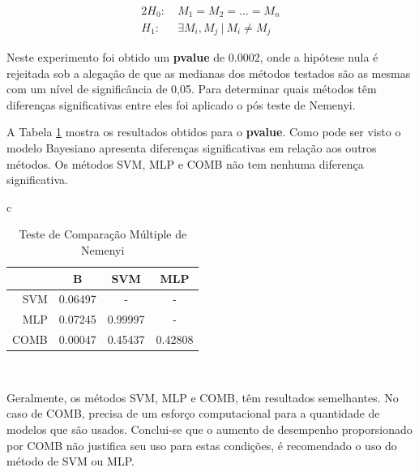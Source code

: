 \documentclass[12pt]{article}
\begin{document}
\begin{alignat*}{2}
  H_0:  & \ M_1 = M_2 = ... =M_n \\
  H_1:  & \ \exists M_i,M_j \ | \ M_i\neq M_j
\end{alignat*}

Neste experimento foi obtido um \textbf{pvalue} de 0.0002, onde a hipótese nula é rejeitada sob a alegação de que as medianas dos métodos testados são as mesmas com um nível de significância de 0,05. Para determinar quais métodos têm diferenças significativas entre eles foi aplicado o pós teste de Nemenyi.

A Tabela \ref{tab:test_nemeyi} mostra os resultados obtidos para o \textbf{pvalue}. Como pode ser visto o modelo Bayesiano apresenta diferenças significativas em relação aos outros métodos. Os métodos SVM, MLP e  COMB não tem nenhuma diferença significativa.

\begin{table}[!h]
\renewcommand{\arraystretch}{1.3}
\caption{Teste de Comparação Múltiple de Nemenyi }
\label{tab:test_nemeyi}
\centering
\begin{tabular}{c}
\begin{tabular}{rccc}
\hline
    &B       &SVM     &MLP         \\    
\hline                             
SVM &0.06497 &-       &-           \\  
MLP &0.07245 &0.99997 &-           \\
COMB &0.00047 &0.45437 &0.42808    \\
\hline 
\end{tabular}\\
\end{tabular}
\end{table}

Geralmente, os métodos SVM, MLP e COMB, têm resultados semelhantes. No caso de COMB, precisa de um esforço computacional  para a quantidade de modelos que são usados. Conclui-se que o aumento de desempenho proporsionado por COMB não justifica seu uso para estas condições, é recomendado o uso do método de SVM ou MLP.



\end{document}
